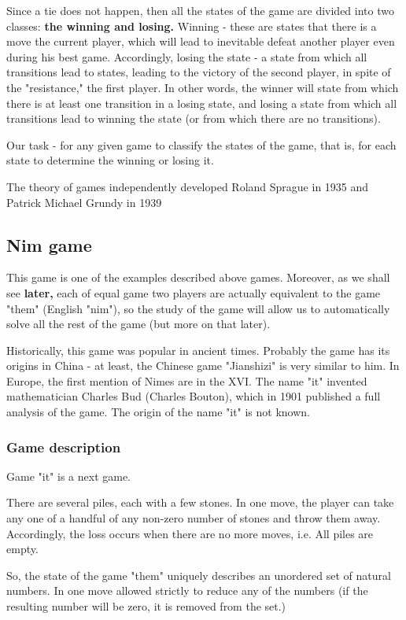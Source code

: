 Since a tie does not happen, then all the states of the game are divided into two classes: \textbf{the winning and losing.} Winning - these are states that there is a move the current player, which will lead to inevitable defeat another player even during his best game. Accordingly, losing the state - a state from which all transitions lead to states, leading to the victory of the second player, in spite of the "resistance," the first player. In other words, the winner will state from which there is at least one transition in a losing state, and losing a state from which all transitions lead to winning the state (or from which there are no transitions).

Our task - for any given game to classify the states of the game, that is, for each state to determine the winning or losing it.

The theory of games independently developed Roland Sprague in 1935 and Patrick Michael Grundy in 1939

\subsection{ Nim game }

This game is one of the examples described above games. Moreover, as we shall see \textbf{later,} each of equal game two players are actually equivalent to the game "them" (English "nim"), so the study of the game will allow us to automatically solve all the rest of the game (but more on that later).

Historically, this game was popular in ancient times. Probably the game has its origins in China - at least, the Chinese game "Jianshizi" is very similar to him. In Europe, the first mention of Nimes are in the XVI. The name "it" invented mathematician Charles Bud (Charles Bouton), which in 1901 published a full analysis of the game. The origin of the name "it" is not known.

\subsubsection{ Game description }

Game "it" is a next game.

There are several piles, each with a few stones. In one move, the player can take any one of a handful of any non-zero number of stones and throw them away. Accordingly, the loss occurs when there are no more moves, i.e. All piles are empty.

So, the state of the game "them" uniquely describes an unordered set of natural numbers. In one move allowed strictly to reduce any of the numbers (if the resulting number will be zero, it is removed from the set.)

